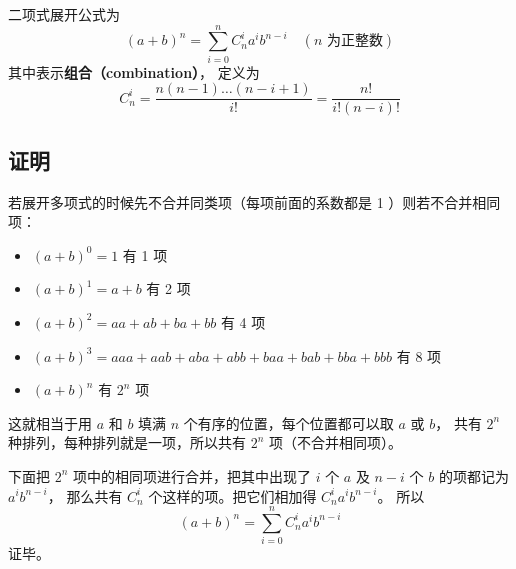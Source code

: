 

二项式展开公式为
\begin{equation}\label{BiNor_eq1}
(a + b)^n = \sum_{i = 0}^n C_n^i a^i b^{n - i} \quad (n \text{ 为正整数})
\end{equation}
其中表示\textbf{组合（combination）}， 定义为 %
\begin{equation}
C_n^i = \frac{n(n - 1)\dots (n - i + 1)}{i!} = \frac{n!}{i!(n - i)!}
\end{equation}

\subsection{证明}\label{BiNor_sub5}
若展开多项式的时候先不合并同类项（每项前面的系数都是 1 ）则若不合并相同项：
\begin{itemize}
\item $(a + b)^0 = 1$ 有 1 项
\item $(a + b)^1 = a + b$ 有 2 项
\item $(a + b)^2 = aa + ab + ba + bb$ 有 4 项
\item $(a + b)^3 = aaa + aab + aba + abb + baa + bab + bba + bbb$ 有 8 项
\item $(a + b)^n$ 有 $2^n$ 项
\end{itemize}

这就相当于用 $a$ 和 $b$ 填满 $n$ 个有序的位置，每个位置都可以取 $a$ 或 $b$， 共有 $2^n$ 种排列，每种排列就是一项，所以共有 $2^n$ 项（不合并相同项）。

下面把 $2^n$ 项中的相同项进行合并，把其中出现了 $i$ 个 $a$ 及 $n-i$ 个 $b$ 的项都记为 $a^i b^{n-i}$， 那么共有 $C_n^i$ 个这样的项。把它们相加得 $C_n^i a^i b^{n-i}$。 所以
\begin{equation}
(a + b)^n = \sum_{i = 0}^n  C_n^i a^i b^{n - i}
\end{equation}
证毕。
